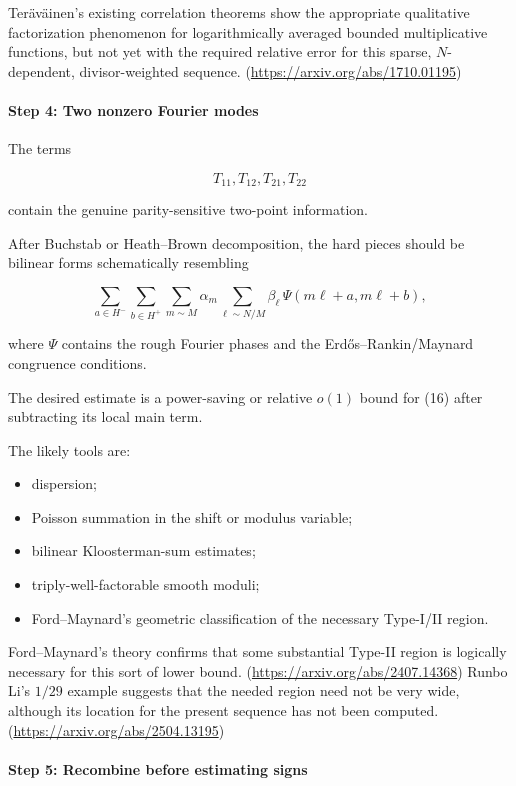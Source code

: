 Teräväinen’s existing correlation theorems show the appropriate qualitative factorization phenomenon for logarithmically averaged bounded multiplicative functions, but not yet with the required relative error for this sparse, \(N\)-dependent, divisor-weighted sequence. (\url{https://arxiv.org/abs/1710.01195})

\paragraph{Step 4: Two nonzero Fourier modes}

The terms

\[
T_{11},T_{12},T_{21},T_{22}
\]

contain the genuine parity-sensitive two-point information.

After Buchstab or Heath–Brown decomposition, the hard pieces should be bilinear forms schematically resembling

\[
\sum_{a\in H^-}
\sum_{b\in H^+}
\sum_{m\sim M}\alpha_m
\sum_{\ell\sim N/M}\beta_\ell\,
\Psi(m\ell+a,m\ell+b),
\tag{16}
\]

where \(\Psi\) contains the rough Fourier phases and the Erdős–Rankin/Maynard congruence conditions.

The desired estimate is a power-saving or relative \(o(1)\) bound for (16) after subtracting its local main term.

The likely tools are:

\begin{itemize}
\item dispersion;
\item Poisson summation in the shift or modulus variable;
\item bilinear Kloosterman-sum estimates;
\item triply-well-factorable smooth moduli;
\item Ford–Maynard’s geometric classification of the necessary Type-I/II region.
\end{itemize}

Ford–Maynard’s theory confirms that some substantial Type-II region is logically necessary for this sort of lower bound. (\url{https://arxiv.org/abs/2407.14368}) Runbo Li’s \(1/29\) example suggests that the needed region need not be very wide, although its location for the present sequence has not been computed. (\url{https://arxiv.org/abs/2504.13195})

\paragraph{Step 5: Recombine before estimating signs}

